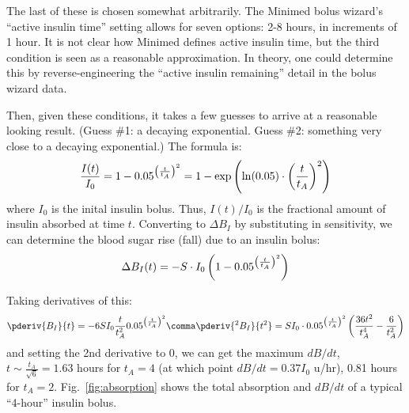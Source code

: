 The last of these is chosen somewhat arbitrarily. The Minimed bolus wizard's ``active insulin time'' 
setting allows for seven options: 2-8 hours, in increments of 1 hour. It is not clear how Minimed 
defines active insulin time, but the third condition is seen as a reasonable approximation. In 
theory, one could determine this by reverse-engineering the ``active insulin remaining'' detail in the 
bolus wizard data.

Then, given these conditions, it takes a few guesses to arrive at a reasonable looking result.
(Guess \#1: a decaying exponential. Guess \#2: something very close to a decaying exponential.) The
formula is:
\begin{equation}
\frac{{I}(t)}{I_0} = 1 - 0.05^{\left({t\over{t_A}}\right)^2} 
= 1-\exp\left( \ln(0.05)\cdot  \left({t\over{t_A}}\right)^2\right)
\end{equation}
where $I_0$ is the inital insulin bolus. Thus, $I(t)/I_0$ is the fractional amount of insulin absorbed
at time $t$. Converting to $\Delta B_I$ by substituting in sensitivity, we can determine the blood
sugar rise (fall) due to an insulin bolus:
\begin{equation}
{\Delta B_I}(t) = -S\cdot I_0\left( 1 - 0.05^{\left({t\over{t_A}}\right)^2} \right)
\label{eq:insulin}
\end{equation}

Taking derivatives of this:
\begin{equation}
\pderiv{B_I}{t} = -6SI_0\frac t{t_A^2} 0.05^{\left(\frac t{t_A}\right)^2}
\comma
\pderiv{^2 B_I}{t^2} = SI_0\cdot0.05^{\left(\frac t{t_A}\right)^2}\left({36t^2\over t_A^4} - {6\over t_A^2} \right)
\end{equation}
and setting the 2nd derivative to 0, we can get the maximum $dB/dt$, $t\sim \frac {t_A}{\sqrt{6}}=1.63$
hours for $t_A=4$ (at which point $dB/dt=0.37I_0$ u/hr), 0.81 hours for $t_A=2$. 
Fig.~\ref{fig:absorption} shows the total absorption and $dB/dt$ of a typical ``4-hour'' insulin bolus.

